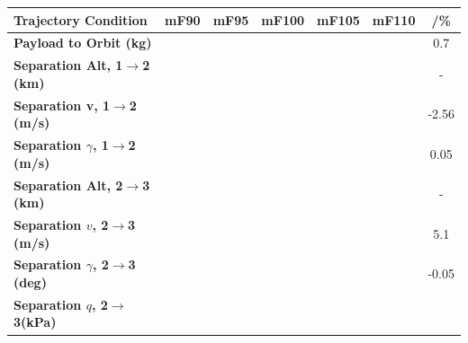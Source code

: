 \begin{table}[ht]
	\centering
\begin{tabular}{l c c c c c c} 
	\hline \textbf{Trajectory Condition}
	&mF90
	&mF95
	&mF100
	&mF105
	&mF110
	& /\%
	\\
	\hline \textbf{Payload to Orbit (kg)}
	& \PayloadToOrbitmFuelNinety
	& \PayloadToOrbitmFuelNinetyFive
	& \PayloadToOrbitmFuelStandard
	& \PayloadToOrbitmFuelOneHundredFive
	& \PayloadToOrbitmFuelOneHundredTen
	&0.7
	\\
	\textbf{Separation Alt, 1$\rightarrow$2 (km)}
	& \firstsecondSeparationAltmFuelNinety
	& \firstsecondSeparationAltmFuelNinetyFive
	& \firstsecondSeparationAltmFuelStandard
	& \firstsecondSeparationAltmFuelOneHundredFive
	& \firstsecondSeparationAltmFuelOneHundredTen
	& -
	\\
	\textbf{Separation v, 1$\rightarrow$2 (m/s)}
	& \firstsecondSeparationvmFuelNinety
	& \firstsecondSeparationvmFuelNinetyFive
	& \firstsecondSeparationvmFuelStandard
	& \firstsecondSeparationvmFuelOneHundredFive
	& \firstsecondSeparationvmFuelOneHundredTen
	&-2.56
	\\
	\textbf{Separation $\gamma$, 1$\rightarrow$2 (m/s)}
	& \firstsecondSeparationgammamFuelNinety
	& \firstsecondSeparationgammamFuelNinetyFive
	& \firstsecondSeparationgammamFuelStandard
	& \firstsecondSeparationgammamFuelOneHundredFive
	& \firstsecondSeparationgammamFuelOneHundredTen
	&0.05
	\\
	\textbf{Separation Alt, 2$\rightarrow$3 (km)}
	& \secondthirdSeparationAltmFuelNinety
	& \secondthirdSeparationAltmFuelNinetyFive
	& \secondthirdSeparationAltmFuelStandard
	& \secondthirdSeparationAltmFuelOneHundredFive
	& \secondthirdSeparationAltmFuelOneHundredTen
	& -
	\\
	\textbf{Separation $v$, 2$\rightarrow$3 (m/s)}
	& \secondthirdSeparationvmFuelNinety
	& \secondthirdSeparationvmFuelNinetyFive
	& \secondthirdSeparationvmFuelStandard
	& \secondthirdSeparationvmFuelOneHundredFive
	& \secondthirdSeparationvmFuelOneHundredTen
	&5.1
	\\
	\textbf{Separation $\gamma$, 2$\rightarrow$3 (deg)}
	& \secondthirdSeparationgammamFuelNinety
	& \secondthirdSeparationgammamFuelNinetyFive
	& \secondthirdSeparationgammamFuelStandard
	& \secondthirdSeparationgammamFuelOneHundredFive
	& \secondthirdSeparationgammamFuelOneHundredTen
	&-0.05
	\\
	\textbf{Separation $q$, 2$\rightarrow$3(kPa)}
	& \secondthirdSeparationqmFuelNinety
	& \secondthirdSeparationqmFuelNinetyFive
	& \secondthirdSeparationqmFuelStandard

\end{tabular}
\end{table}
